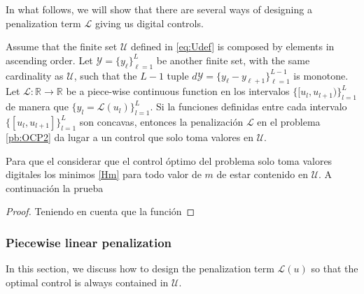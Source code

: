 In what follows, we will show that there are several ways of designing a penalization term $\mathcal L$ giving us digital controls.
\newline
\begin{theorem}
Assume that the finite set $\mathcal{U}$ defined in \eqref{eq:Udef} is composed by elements in ascending order. Let $\mathcal{Y} = \{y_\ell\}_{\ell=1}^L$ be another finite set, with the same cardinality as $\mathcal U$, such that the $L-1$ tuple $d\mathcal{Y} = \{y_\ell - y_{\ell+1}\}_{\ell=1}^{L-1}$ is monotone. Let $\mathcal{L}:\mathbb{R} \rightarrow \mathbb{R}$ be a piece-wise continuous function en los intervalos $\{ [u_l,u_{l+1})\}_{l=1}^L$ de manera que $\{y_l = \mathcal{L}(u_l)\}_{l=1}^L$. Si la funciones definidas entre cada intervalo $\{[u_l,u_{l+1}]\}_{l=1}^L$ son concavas, entonces la penalización $\mathcal{L}$ en el problema \ref{pb:OCP2} da lugar a un control que solo toma valores en $\mathcal{U}$.
\end{theorem}
Para que el considerar que el control óptimo del problema solo toma valores digitales los minimos  \ref{Hm} para todo valor de $m$ de estar contenido en $\mathcal{U}$. A continuación la prueba
\newline

\begin{proof}
    Teniendo en cuenta que la función 
\end{proof}

\subsubsection{Piecewise linear penalization}

In this section, we discuss how to design the penalization term $\mathcal{L}(u)$ so that the optimal control is always contained in $\mathcal{U}$. 

